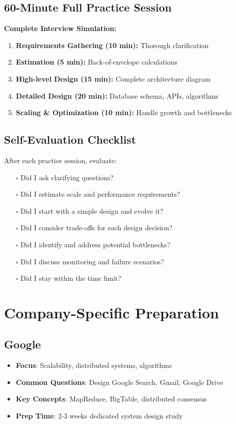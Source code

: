 \documentclass[10pt,a4paper]{article}
\begin{document}
\subsection{60-Minute Full Practice Session}

\begin{frameworkbox}
\textbf{Complete Interview Simulation:}
\begin{enumerate}
\item \textbf{Requirements Gathering (10 min):} Thorough clarification
\item \textbf{Estimation (5 min):} Back-of-envelope calculations
\item \textbf{High-level Design (15 min):} Complete architecture diagram
\item \textbf{Detailed Design (20 min):} Database schema, APIs, algorithms
\item \textbf{Scaling \& Optimization (10 min):} Handle growth and bottlenecks
\end{enumerate}
\end{frameworkbox}

\subsection{Self-Evaluation Checklist}

After each practice session, evaluate:
\begin{itemize}
\item[$\square$] Did I ask clarifying questions?
\item[$\square$] Did I estimate scale and performance requirements?
\item[$\square$] Did I start with a simple design and evolve it?
\item[$\square$] Did I consider trade-offs for each design decision?
\item[$\square$] Did I identify and address potential bottlenecks?
\item[$\square$] Did I discuss monitoring and failure scenarios?
\item[$\square$] Did I stay within the time limit?
\end{itemize}

\section{Company-Specific Preparation}

\subsection{Google}
\begin{itemize}
\item \textbf{Focus}: Scalability, distributed systems, algorithms
\item \textbf{Common Questions}: Design Google Search, Gmail, Google Drive
\item \textbf{Key Concepts}: MapReduce, BigTable, distributed consensus
\item \textbf{Prep Time}: 2-3 weeks dedicated system design study
\end{itemize}
\end{document}
